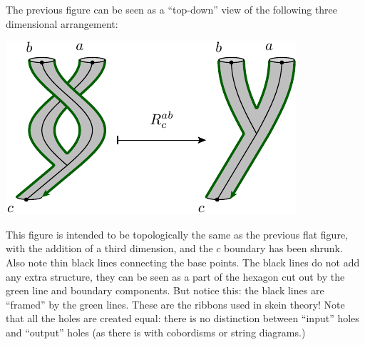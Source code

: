 The previous figure can be seen as a ``top-down'' view of the
following three dimensional arrangement:
\begin{center}
\includegraphics[]{pic-rmove-skein.pdf}
\end{center}
This figure is intended to be topologically
the same as the previous flat figure,
with the addition of a third dimension,
and the $c$ boundary has been shrunk.
Also note thin black lines
connecting the base points.
The black lines do not add any extra structure, they can
be seen as a part of the hexagon cut out by
the green line and boundary components.
But notice this: the black lines are ``framed'' by the green lines. 
These are the ribbons used in skein theory!
Note that all the holes are created equal: there is
no distinction between ``input'' holes and ``output'' holes
(as there is with cobordisms or string diagrams.)


